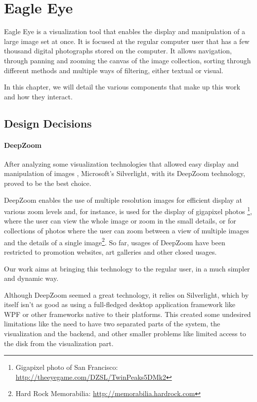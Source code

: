 \chapter{Eagle Eye}
\label{cha:eagle_eye}


Eagle Eye is a visualization tool that enables the display and manipulation of a large image set at once. It is focused at the regular computer user that has a few thousand digital photographs stored on the computer. It allows navigation, through panning and zooming the canvas of the image collection, sorting through different methods and multiple ways of filtering, either textual or visual.

In this chapter, we will detail the various components that make up this work and how they interact.


\section{Design Decisions} %
\label{sub:design_decisions}

\subsubsection{DeepZoom} %
\label{ssub:deepzoom}

After analyzing some visualization technologies that allowed easy display and manipulation of images , Microsoft’s Silverlight, with its DeepZoom technology, proved to be the best choice.

DeepZoom enables the use of multiple resolution images for efficient display at various zoom levels and, for instance, is used for the display of gigapixel photos \footnote{Gigapixel photo of San Francisco: \url{http://theeyegame.com/DZSL/TwinPeaks5DMk2}}, where the user can view the whole image or zoom in the small details, or for collections of photos where the user can zoom between a view of multiple images and the details of a single image\footnote{Hard Rock Memorabilia: \url{http://memorabilia.hardrock.com}}. So far, usages of DeepZoom have been restricted to promotion websites, art galleries and other closed usages.

Our work aims at bringing this technology to the regular user, in a much simpler and dynamic way.

Although DeepZoom seemed a great technology, it relies on Silverlight, which by itself isn't as good as using a full-fledged desktop application framework like \ac{WPF} or other frameworks native to their platforms. This created some undesired limitations like the need to have two separated parts of the system, the visualization and the backend, and other smaller problems like limited access to the disk from the visualization part.

